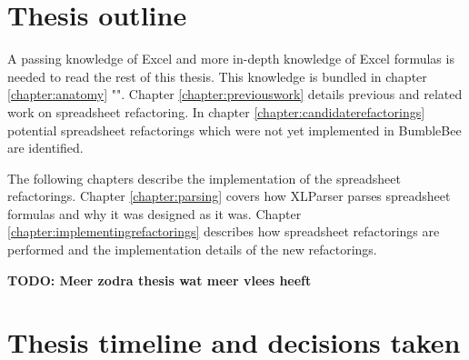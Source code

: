 \documentclass[12pt,a4paper,onecolumn,oneside]{memoir}
\newcommand{\todo}[1]{\textbf{TODO: #1}}
\begin{document}
\section{Thesis outline}

A passing knowledge of Excel and more in-depth knowledge of Excel formulas is needed to read the rest of this thesis.
This knowledge is bundled in chapter \ref{chapter:anatomy} "".
Chapter \ref{chapter:previouswork} details previous and related work on spreadsheet refactoring.
In chapter \ref{chapter:candidaterefactorings} potential spreadsheet refactorings which were not yet implemented in BumbleBee are identified.

The following chapters describe the implementation of the spreadsheet refactorings.
Chapter \ref{chapter:parsing} covers how XLParser parses spreadsheet formulas and why it was designed as it was.
Chapter \ref{chapter:implementingrefactorings} describes how spreadsheet refactorings are performed and the implementation details of the new refactorings.

\todo{Meer zodra thesis wat meer vlees heeft}

\clearpage
\section{Thesis timeline and decisions taken}
\end{document}
